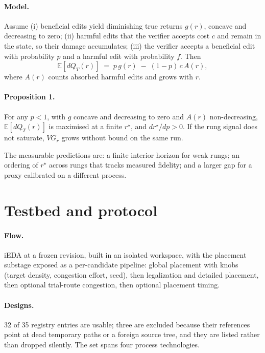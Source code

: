 \documentclass{article}
\begin{document}
\paragraph{Model.} Assume (i) beneficial edits yield diminishing true returns $g(r)$,
concave and decreasing to zero; (ii) harmful edits that the verifier accepts cost $c$
and remain in the state, so their damage accumulates; (iii) the verifier accepts a
beneficial edit with probability $p$ and a harmful edit with probability $f$. Then
\begin{equation}
\mathbb{E}[dQ_T(r)] \;=\; p\,g(r) \;-\; (1-p)\,c\,A(r),
\end{equation}
where $A(r)$ counts absorbed harmful edits and grows with $r$.

\paragraph{Proposition 1.} For any $p<1$, with $g$ concave and decreasing to zero and
$A(r)$ non-decreasing, $\mathbb{E}[dQ_T(r)]$ is maximised at a finite $r^\star$, and
$dr^\star/dp > 0$. If the rung signal does not saturate, $VG_r$ grows without bound on
the same run.

The measurable predictions are: a finite interior horizon for weak rungs; an ordering
of $r^\star$ across rungs that tracks measured fidelity; and a larger gap for a proxy
calibrated on a different process.

\section{Testbed and protocol}
\label{sec:testbed}

\paragraph{Flow.} iEDA at a frozen revision, built in an isolated workspace, with the
placement substage exposed as a per-candidate pipeline: global placement with knobs
(target density, congestion effort, seed), then legalization and detailed placement,
then optional trial-route congestion, then optional placement timing.

\paragraph{Designs.} 32 of 35 registry entries are usable; three are excluded because
their references point at dead temporary paths or a foreign source tree, and they are
listed rather than dropped silently. The set spans four process technologies.
\end{document}

